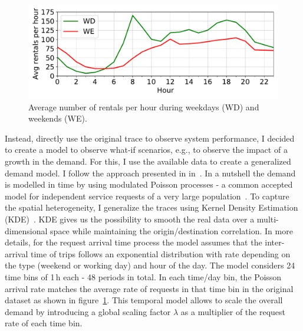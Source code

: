 \begin{figure}[t]
    \begin{center}
             \includegraphics[width=\columnwidth]{fig/RentalsHour.pdf}
             \caption{Average number of rentals per hour during weekdays (WD) and weekends (WE). }
             \label{fig:10_3_rentals_per_hour}
            \end{center}
\end{figure}




Instead, directly use the original trace to observe system performance, I decided to create a model to observe what-if scenarios, e.g., to observe the impact of a growth in the demand. For this, I use the available data to create a generalized demand model. I follow the approach presented in in~\cite{ciociola2020}. In a nutshell the demand is modelled in time by using modulated Poisson processes - a common accepted model for independent service requests of a very large population~\cite{poisson_inh}. To capture the spatial heterogeneity, I generalize the traces using Kernel Density Estimation (KDE)~\cite{kde_spatial}. KDE gives us the possibility to smooth the real data over a multi-dimensional space while maintaining the origin/destination correlation.
In more details, for the request arrival time process the model assumes that the inter-arrival time of trips follows an exponential distribution with rate depending on the type (weekend or working day) and hour of the day. The model considers 24 time bins of 1\,h each - 48 periods in total. In each time/day bin, the Poisson arrival rate matches the average rate of requests in that time bin in the original dataset as shown in figure~\ref{fig:10_3_rentals_per_hour}. This temporal model allows to scale the overall demand by introducing a global scaling factor $\lambda$ as a multiplier of the request rate of each time bin.

